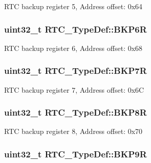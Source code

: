 R\-T\-C backup register 5, Address offset\-: 0x64 \hypertarget{struct_r_t_c___type_def_a766e2071c5826e3a299ae1cd5bbf06f7}{
\subsubsection[{B\-K\-P6\-R}]{ uint32\-\_\-t R\-T\-C\-\_\-\-Type\-Def\-::\-B\-K\-P6\-R}}\label{struct_r_t_c___type_def_a766e2071c5826e3a299ae1cd5bbf06f7}
R\-T\-C backup register 6, Address offset\-: 0x68 \hypertarget{struct_r_t_c___type_def_a9934af6ae6b3f5660204d48ceb2f3192}{
\subsubsection[{B\-K\-P7\-R}]{ uint32\-\_\-t R\-T\-C\-\_\-\-Type\-Def\-::\-B\-K\-P7\-R}}\label{struct_r_t_c___type_def_a9934af6ae6b3f5660204d48ceb2f3192}
R\-T\-C backup register 7, Address offset\-: 0x6\-C \hypertarget{struct_r_t_c___type_def_a0e7fca11f1c953270ee0ee6028860add}{
\subsubsection[{B\-K\-P8\-R}]{ uint32\-\_\-t R\-T\-C\-\_\-\-Type\-Def\-::\-B\-K\-P8\-R}}\label{struct_r_t_c___type_def_a0e7fca11f1c953270ee0ee6028860add}
R\-T\-C backup register 8, Address offset\-: 0x70 \hypertarget{struct_r_t_c___type_def_abadf1ac26350bf00575428be6a05708b}{
\subsubsection[{B\-K\-P9\-R}]{ uint32\-\_\-t R\-T\-C\-\_\-\-Type\-Def\-::\-B\-K\-P9\-R}}\label{struct_r_t_c___type_def_abadf1ac26350bf00575428be6a05708b}
